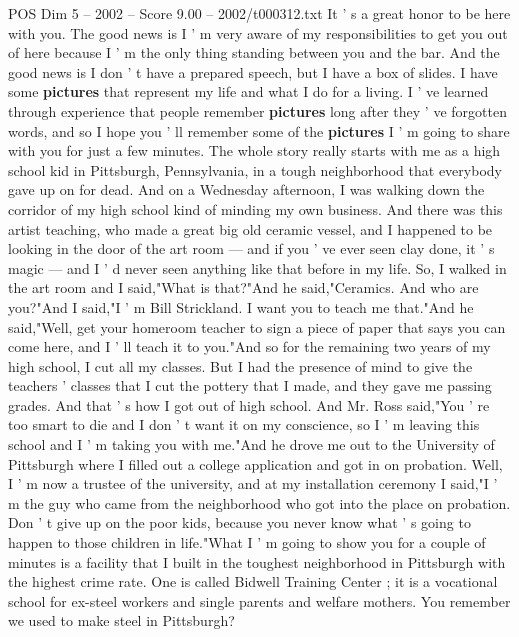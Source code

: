 \begin{textsample}{POS Dim 5 – 2002 – Score 9.00 – 2002/t000312.txt}  \label{ex:f5_pos_004}
It ' s a great honor to be here with you.
The good news is I ' m very aware of my responsibilities to get you out of here because I ' m the only thing standing between you and the bar.
And the good news is I don ' t have a prepared speech, but I have a box of slides.
I have some \textbf{pictures} that represent my life and what I do for a living.
I ' ve learned through experience that people remember \textbf{pictures} long after they ' ve forgotten words, and so I hope you ' ll remember some of the \textbf{pictures} I ' m going to share with you for just a few minutes.
The whole story really starts with me as a high school kid in Pittsburgh, Pennsylvania, in a tough neighborhood that everybody gave up on for dead.
And on a Wednesday afternoon, I was walking down the corridor of my high school kind of minding my own business.
And there was this artist teaching, who made a great big old ceramic vessel, and I happened to be looking in the door of the art room — and if you ' ve ever seen clay done, it ' s magic — and I ' d never seen anything like that before in my life.
So, I walked in the art room and I said,"What is that?"And he said,"Ceramics.
And who are you?"And I said,"I ' m Bill Strickland.
I want you to teach me that."And he said,"Well, get your homeroom teacher to sign a piece of paper that says you can come here, and I ' ll teach it to you."And so for the remaining two years of my high school, I cut all my classes.
But I had the presence of mind to give the teachers ' classes that I cut the pottery that I made, and they gave me passing grades.
And that ' s how I got out of high school.
And Mr.
Ross said,"You ' re too smart to die and I don ' t want it on my conscience, so I ' m leaving this school and I ' m taking you with me."And he drove me out to the University of Pittsburgh where I filled out a college application and got in on probation.
Well, I ' m now a trustee of the university, and at my installation ceremony I said,"I ' m the guy who came from the neighborhood who got into the place on probation.
Don ' t give up on the poor kids, because you never know what ' s going to happen to those children in life."What I ' m going to show you for a couple of minutes is a facility that I built in the toughest neighborhood in Pittsburgh with the highest crime rate.
One is called Bidwell Training Center ; it is a vocational school for ex-steel workers and single parents and welfare mothers.
You remember we used to make steel in Pittsburgh?

\end{textsample}

